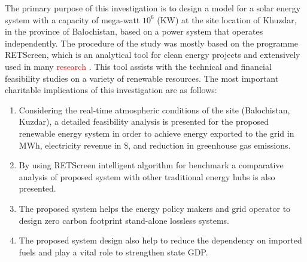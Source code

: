 \documentclass[conference]{IEEEtran}
\begin{document}
The primary purpose of this investigation is to design a model for a solar energy system with a capacity of mega-watt $10^6$ (KW) at the site location of Khuzdar, in the province of Balochistan, based on a power system that operates independently. The procedure of the study was mostly based on the programme RETScreen, which is an analytical tool for clean energy projects and extensively used in many \textcolor{red}{research \cite{mirzahosseini2012environmental,moya2018technical,pan2017feasibility,owolabi2019validating}} . This tool assists with the technical and financial feasibility studies on a variety of renewable resources. The most important charitable implications of this investigation are as follows:
\begin{enumerate}
    \item Considering the real-time atmospheric conditions of the site (Balochistan, Kuzdar), a detailed feasibility analysis is presented for the proposed renewable energy system in order to achieve energy exported to the grid in MWh, electricity revenue in \$, and  reduction in greenhouse gas emissions.
    \item By using RETScreen \textsuperscript{\textregistered} intelligent algorithm for benchmark a comparative analysis of proposed system with other traditional energy hubs is also presented.
    \item The proposed system helps the energy policy makers and grid operator to design zero carbon footprint stand-alone lossless systems.
    \item The proposed system design also help to reduce the dependency on imported fuels and play a vital role to strengthen state GDP.

\end{enumerate}
\end{document}
